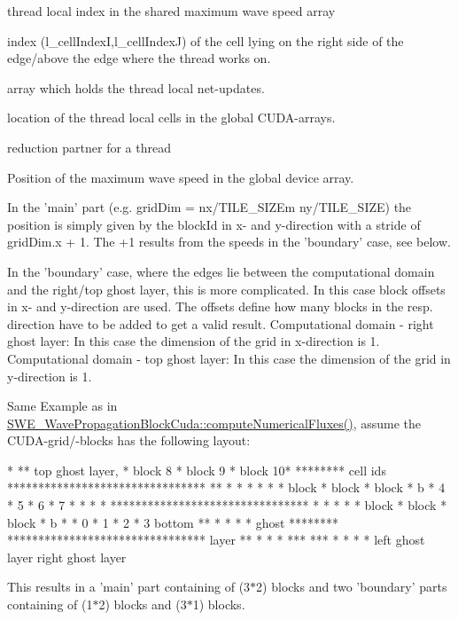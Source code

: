 thread local index in the shared maximum wave speed array

index (l\-\_\-cell\-Index\-I,l\-\_\-cell\-Index\-J) of the cell lying on the right side of the edge/above the edge where the thread works on.

array which holds the thread local net-\/updates.

location of the thread local cells in the global C\-U\-D\-A-\/arrays.

reduction partner for a thread

Position of the maximum wave speed in the global device array.

In the 'main' part (e.\-g. grid\-Dim = nx/\-T\-I\-L\-E\-\_\-\-S\-I\-Z\-Em ny/\-T\-I\-L\-E\-\_\-\-S\-I\-Z\-E) the position is simply given by the block\-Id in x-\/ and y-\/direction with a stride of grid\-Dim.\-x + 1. The +1 results from the speeds in the 'boundary' case, see below.

In the 'boundary' case, where the edges lie between the computational domain and the right/top ghost layer, this is more complicated. In this case block offsets in x-\/ and y-\/direction are used. The offsets define how many blocks in the resp. direction have to be added to get a valid result. Computational domain -\/ right ghost layer\-: In this case the dimension of the grid in x-\/direction is 1. Computational domain -\/ top ghost layer\-: In this case the dimension of the grid in y-\/direction is 1.

Same Example as in \hyperlink{classSWE__WavePropagationBlockCuda_a8a89bf61b9fc4433652f400ca8e564ed}{S\-W\-E\-\_\-\-Wave\-Propagation\-Block\-Cuda\-::compute\-Numerical\-Fluxes()}, assume the C\-U\-D\-A-\/grid/-\/blocks has the following layout\-: 
\begin{DoxyPre}
                                                         *
                                                        **        top ghost layer,
                       * block 8 * block 9 * block 10* ********   cell ids
                       ******************************** **
                       *         *         *         *   *
                       *  block  *  block  *  block  * b
                       *    4    *    5    *    6    * 7
                       *         *         *         *
                       ********************************
                       *         *         *         *
                       *  block  *  block  *  block  * b
                   *   *    0    *    1    *    2    * 3
    bottom         **  *         *         *         *
    ghost     ******** ********************************
    layer          **
                   *   *                              *
                      ***                            ***
                       *                              *
                       *                              *
                 left ghost layer              right ghost layer
\end{DoxyPre}
 This results in a 'main' part containing of (3$\ast$2) blocks and two 'boundary' parts containing of (1$\ast$2) blocks and (3$\ast$1) blocks.

